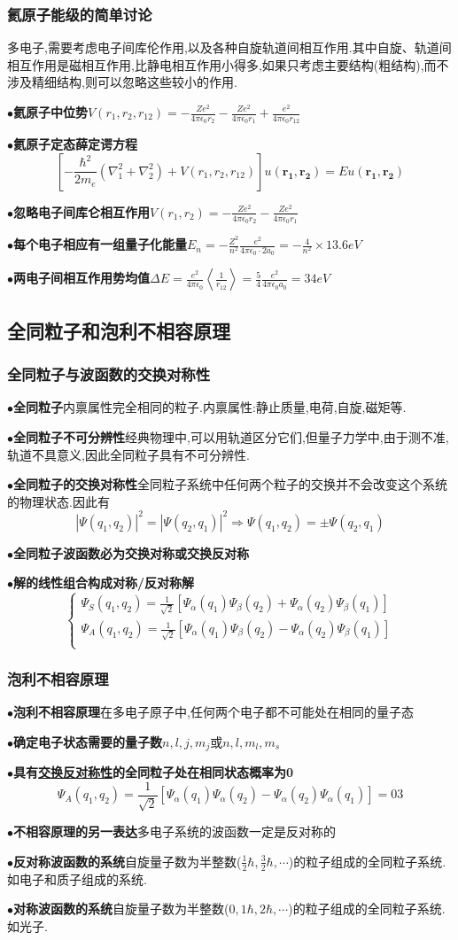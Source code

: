 \documentclass[UTF8]{article}
\newcommand{\keypoint}[2]{$\bullet$\textbf{#1}\quad#2\par}
\begin{document}
\subsubsection{氦原子能级的简单讨论}
多电子,需要考虑电子间库伦作用,以及各种自旋轨道间相互作用.其中自旋、轨道间相互作用是磁相互作用,比静电相互作用小得多,如果只考虑主要结构(粗结构),而不涉及精细结构,则可以忽略这些较小的作用.\par
\keypoint{氦原子中位势}{$V(r_1,r_2,r_{12})=-\frac{Ze^2}{4\pi\epsilon_{0}r_2}-\frac{Ze^2}{4\pi\epsilon_{0}r_1}+\frac{e^2}{4\pi\epsilon_{0}r_{12}}$}
\keypoint{氦原子定态薛定谔方程}{$$\left[-\frac{\hbar^2}{2m_e}(\nabla_1^2+\nabla_2^2)+V(r_1,r_2,r_{12})\right]u(\bm{r_1},\bm{r_2})=Eu(\bm{r_1},\bm{r_2})$$}
\keypoint{忽略电子间库仑相互作用}{$V(r_1,r_2)=-\frac{Ze^2}{4\pi\epsilon_{0}r_2}-\frac{Ze^2}{4\pi\epsilon_{0}r_1}$}
\keypoint{每个电子相应有一组量子化能量}{$E_n=-\frac{Z^2}{n^2}\frac{e^2}{4\pi\epsilon_0\cdot2a_0}=-\frac{4}{n^2}\times13.6eV$}
\keypoint{两电子间相互作用势均值}{$\Delta E=\frac{e^2}{4\pi\epsilon_0}\left\langle \frac{1}{r_{12}}\right\rangle=\frac{5}{4}\frac{e^2}{4\pi\epsilon_0a_0}=34eV$}
\subsection{全同粒子和泡利不相容原理}
\subsubsection{全同粒子与波函数的交换对称性}
\keypoint{全同粒子}{内禀属性完全相同的粒子.内禀属性:静止质量,电荷,自旋,磁矩等.}
\keypoint{全同粒子不可分辨性}{经典物理中,可以用轨道区分它们,但量子力学中,由于测不准,轨道不具意义,因此全同粒子具有不可分辨性.}
\keypoint{全同粒子的交换对称性}{全同粒子系统中任何两个粒子的交换并不会改变这个系统的物理状态.因此有
	$$|\Psi(q_1,q_2)|^2=|\Psi(q_2,q_1)|^2
	\Rightarrow
	\Psi(q_1,q_2)=\pm\Psi(q_2,q_1)$$
}
\keypoint{全同粒子波函数必为交换对称或交换反对称}{}
\keypoint{解的线性组合构成对称/反对称解}{
	$$ \left\{
	\begin{array}{l}
	\Psi_S(q_1,q_2)=\frac{1}{\sqrt{2}}\left[\Psi_\alpha(q_1)\Psi_\beta(q_2)+\Psi_\alpha(q_2)\Psi_\beta(q_1)\right]\\
	\Psi_A(q_1,q_2)=\frac{1}{\sqrt{2}}\left[\Psi_\alpha(q_1)\Psi_\beta(q_2)-\Psi_\alpha(q_2)\Psi_\beta(q_1)\right]\\
	\end{array}
	\right.
	$$
}
\subsubsection{泡利不相容原理}
\keypoint{泡利不相容原理}{在多电子原子中,任何两个电子都不可能处在相同的量子态}
\keypoint{确定电子状态需要的量子数}{$n,l,j,m_j$或$n,l,m_l,m_s$}
\keypoint{具有\underline{交换反对称性}的全同粒子处在相同状态概率为0}{
	$$	\Psi_A(q_1,q_2)=\frac{1}{\sqrt{2}}\left[\Psi_\alpha(q_1)\Psi_\alpha(q_2)-\Psi_\alpha(q_2)\Psi_\alpha(q_1)\right]=03
	$$
}
\keypoint{不相容原理的另一表达}{多电子系统的波函数一定是反对称的}
\keypoint{反对称波函数的系统}{自旋量子数为半整数($\frac{1}{2}\hbar,\frac{3}{2}\hbar,\cdots$)的粒子组成的全同粒子系统.如电子和质子组成的系统.}
\keypoint{对称波函数的系统}{自旋量子数为半整数($0,1\hbar,2\hbar,\cdots$)的粒子组成的全同粒子系统.如光子.}
\end{document}

